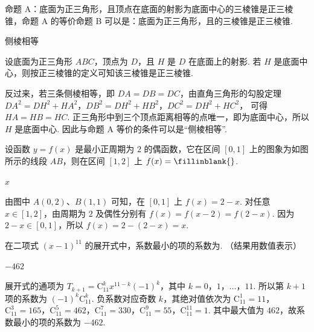 \begin{problem}
命题 A：底面为正三角形，且顶点在底面的射影为底面中心的三棱锥是正三棱锥，命题 A 的等价命题 B 可以是：底面为正三角形，且\fillinblank{}的三棱锥是正三棱锥.
\end{problem}

\begin{answer}
侧棱相等
\end{answer}

\begin{solution}
设底面为正三角形 \(ABC\)，顶点为 \(D\)，且 \(H\) 是 \(D\) 在底面上的射影. 若 \(H\) 是底面中心，则按正三棱锥的定义可知该三棱锥是正三棱锥.

反过来，若三条侧棱相等，即 \(DA=DB=DC\)，由直角三角形的勾股定理
\(DA^2=DH^2+HA^2\)，\(DB^2=DH^2+HB^2\)，\(DC^2=DH^2+HC^2\)，
可得 \(HA=HB=HC\). 正三角形中到三个顶点距离相等的点唯一，即为底面中心，所以 \(H\) 是底面中心. 因此与命题 A 等价的条件可以是“侧棱相等”.
\end{solution}

\begin{problem}
设函数 \(y=f(x)\) 是最小正周期为 \(2\) 的偶函数，它在区间 \([0,1]\) 上的图象为如图所示的线段 \(AB\)，则在区间 \([1,2]\) 上 \(f(x)=\fillinblank{}\).

\end{problem}

\begin{answer}
\(x\)
\end{answer}

\begin{solution}
由图中 \(A(0,2)\)、\(B(1,1)\) 可知，在 \([0,1]\) 上
\(f(x)=2-x\).
对任意 \(x\in[1,2]\)，由周期为 \(2\) 及偶性分别有
\(f(x)=f(x-2)=f(2-x)\).
因为 \(2-x\in[0,1]\)，所以
\(f(x)=2-(2-x)=x\).
\end{solution}

\begin{problem}
在二项式 \((x-1)^{11}\) 的展开式中，系数最小的项的系数为\fillinblank{}. （结果用数值表示）
\end{problem}

\begin{answer}
\(-462\)
\end{answer}

\begin{solution}
展开式的通项为 \(T_{k+1}=\mathrm C_{11}^k x^{11-k}(-1)^k\)，其中 \(k=0\)，\(1\)，\(\ldots\)，\(11\). 所以第 \(k+1\) 项的系数为 \((-1)^k\mathrm C_{11}^k\). 负系数对应奇数 \(k\)，其绝对值依次为 \(\mathrm C_{11}^1=11\)，\(\mathrm C_{11}^3=165\)，\(\mathrm C_{11}^5=462\)，\(\mathrm C_{11}^7=330\)，\(\mathrm C_{11}^9=55\)，\(\mathrm C_{11}^{11}=1\).
其中最大值为 \(462\)，故系数最小的项的系数为 \(-462\).
\end{solution}

